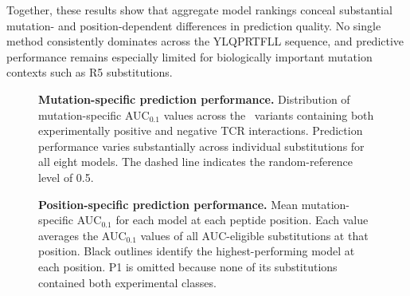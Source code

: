 \documentclass{article}
\begin{document}
Together, these results show that aggregate model rankings conceal
substantial mutation- and position-dependent differences in prediction
quality. No single method consistently dominates across the YLQPRTFLL
sequence, and predictive performance remains especially limited for
biologically important mutation contexts such as R5 substitutions.%
\begin{figure}[!htbp]
\centering

%

\caption{
\textbf{Mutation-specific prediction performance.}
Distribution of mutation-specific AUC$_{0.1}$ values across the
\valNeligible\ variants containing both experimentally positive and negative
TCR interactions. Prediction performance varies substantially across
individual substitutions for all eight models. The dashed line indicates
the random-reference level of 0.5.
}
\label{fig:mutation_auc_distribution}

\end{figure}


\begin{figure}[!htbp]
\centering

%

\caption{
\textbf{Position-specific prediction performance.}
Mean mutation-specific AUC$_{0.1}$ for each model at each peptide
position. Each value averages the AUC$_{0.1}$ values of all
AUC-eligible substitutions at that position. Black outlines identify
the highest-performing model at each position. P1 is omitted because
none of its substitutions contained both experimental classes.
}
\label{fig:position_auc_heatmap}

\end{figure}
\end{document}
